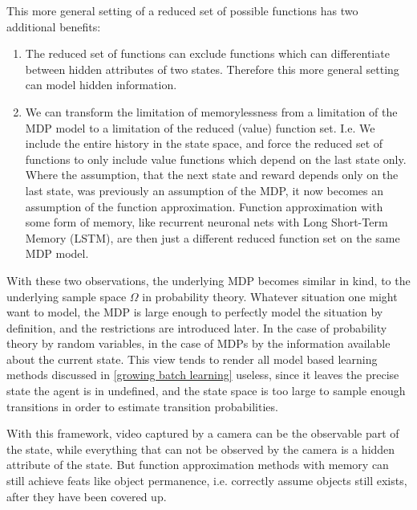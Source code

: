 This more general setting of a reduced set of possible functions has two additional benefits:
\begin{enumerate}
	\item The reduced set of functions can exclude functions which can differentiate between hidden attributes of two states. Therefore this more general setting can model hidden information. 
	\item We can transform the limitation of memorylessness from a limitation of the MDP model to a limitation of the reduced (value) function set. I.e. We include the entire history in the state space, and force the reduced set of functions to only include value functions which depend on the last state only. Where the assumption, that the next state and reward depends only on the last state, was previously an assumption of the MDP, it now becomes an assumption of the function approximation. Function approximation with some form of memory, like recurrent neuronal nets with Long Short-Term Memory (LSTM), are then just a different reduced function set on the same MDP model.
\end{enumerate}
With these two observations, the underlying MDP becomes similar in kind, to the underlying sample space \(\Omega\) in probability theory. Whatever situation one might want to model, the MDP is large enough to perfectly model the situation by definition, and the restrictions are introduced later. In the case of probability theory by random variables, in the case of MDPs by the information available about the current state. This view tends to render all model based learning methods discussed in \ref{growing batch learning} useless, since it leaves the precise state the agent is in undefined, and the state space is too large to sample enough transitions in order to estimate transition probabilities.

With this framework, video captured by a camera can be the observable part of the state, while everything that can not be observed by the camera is a hidden attribute of the state. But function approximation methods with memory can still achieve feats like object permanence, i.e. correctly assume objects still exists, after they have been covered up. 

